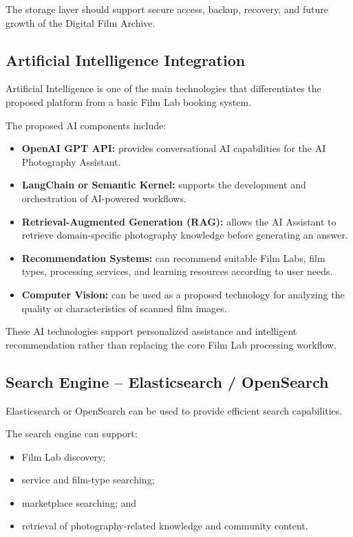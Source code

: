 The storage layer should support secure access, backup, recovery, and future
growth of the Digital Film Archive.

\subsection{Artificial Intelligence Integration}

Artificial Intelligence is one of the main technologies that differentiates
the proposed platform from a basic Film Lab booking system.

The proposed AI components include:

\begin{itemize}
    \item \textbf{OpenAI GPT API:} provides conversational AI capabilities
    for the AI Photography Assistant.

    \item \textbf{LangChain or Semantic Kernel:} supports the development and
    orchestration of AI-powered workflows.

    \item \textbf{Retrieval-Augmented Generation (RAG):} allows the AI
    Assistant to retrieve domain-specific photography knowledge before
    generating an answer.

    \item \textbf{Recommendation Systems:} can recommend suitable Film Labs,
    film types, processing services, and learning resources according to
    user needs.

    \item \textbf{Computer Vision:} can be used as a proposed technology for
    analyzing the quality or characteristics of scanned film images.
\end{itemize}

These AI technologies support personalized assistance and intelligent
recommendation rather than replacing the core Film Lab processing workflow.

\subsection{Search Engine -- Elasticsearch / OpenSearch}

Elasticsearch or OpenSearch can be used to provide efficient search
capabilities.

The search engine can support:

\begin{itemize}
    \item Film Lab discovery;
    \item service and film-type searching;
    \item marketplace searching; and
    \item retrieval of photography-related knowledge and community content.
\end{itemize}

